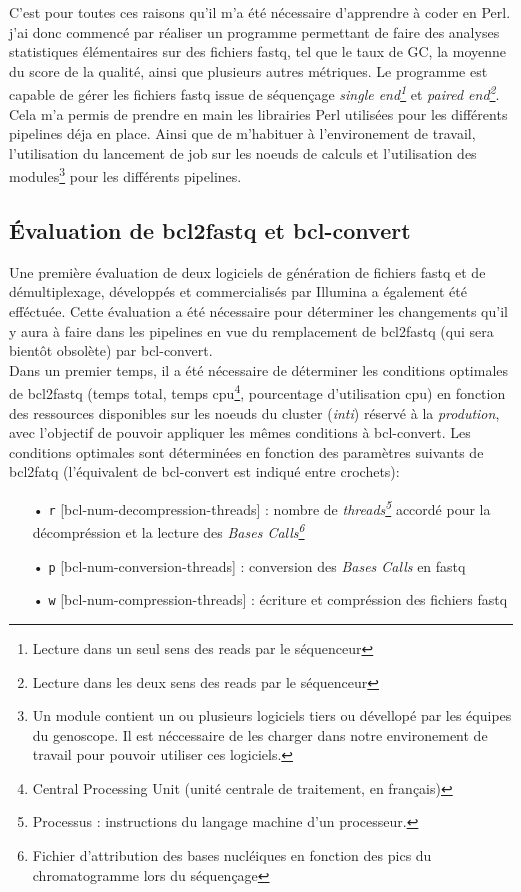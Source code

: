 C'est pour toutes ces raisons qu'il m'a été nécessaire d'apprendre à coder en Perl. j'ai donc commencé par réaliser un programme permettant de faire des analyses statistiques élémentaires sur des fichiers fastq, tel que le taux de GC, la moyenne du score de la qualité, ainsi que plusieurs autres métriques. Le programme est capable de gérer les fichiers fastq issue de séquençage \emph{single end\footnote{Lecture dans un seul sens des reads par le séquenceur}} et \emph{paired end\footnote{Lecture dans les deux sens des reads par le séquenceur}}. Cela m'a permis de prendre en main les librairies Perl utilisées pour les différents pipelines déja en place. Ainsi que de m'habituer à l'environement de travail, l'utilisation du lancement de job sur les noeuds de calculs et l'utilisation des modules\footnote{Un module contient un ou plusieurs logiciels tiers ou dévellopé par les équipes du genoscope. Il est néccessaire de les charger dans notre environement de travail pour pouvoir utiliser ces logiciels.} pour les différents pipelines.

\subsection{Évaluation de bcl2fastq et bcl-convert}
Une première évaluation de deux logiciels de génération de fichiers fastq et de démultiplexage, développés et commercialisés par Illumina a également été efféctuée. Cette évaluation a été nécessaire pour déterminer les changements qu'il y aura à faire dans les pipelines en vue du remplacement de bcl2fastq (qui sera bientôt obsolète) par bcl-convert.\\

Dans un premier temps, il a été nécessaire de déterminer les conditions optimales de bcl2fastq (temps total, temps cpu\footnote{Central Processing Unit (unité centrale de traitement, en français)}, pourcentage d'utilisation cpu) en fonction des ressources disponibles sur les noeuds du cluster (\emph{inti}) réservé à la \emph{prodution}, avec l'objectif de pouvoir appliquer les mêmes conditions à bcl-convert. Les conditions optimales sont déterminées en fonction des paramètres suivants de bcl2fatq (l'équivalent de bcl-convert est indiqué entre crochets): \\
\begin{itemize}
    \item[•] \texttt{r} [bcl-num-decompression-threads] : nombre de \emph{threads\footnote{Processus : instructions du langage machine d'un processeur.}} accordé pour la décompréssion et la lecture des \emph{Bases Calls\footnote{Fichier d'attribution des bases nucléiques en fonction des pics du chromatogramme lors du séquençage}}
    \item[•] \texttt{p} [bcl-num-conversion-threads] : conversion des \emph{Bases Calls} en fastq
    \item[•] \texttt{w} [bcl-num-compression-threads] : écriture et compréssion des fichiers fastq\\
\end{itemize}

